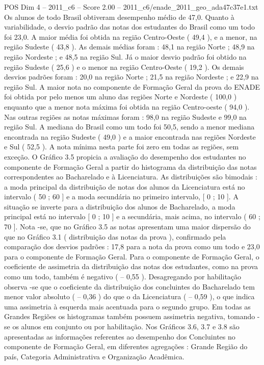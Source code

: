 \begin{textsample}{POS Dim 4 – 2011\_c6 – Score 2.00 – 2011\_c6/enade\_2011\_geo\_ada47c37e1.txt}
Os alunos de todo Brasil obtiveram desempenho médio de 47,0.
Quanto à variabilidade, o desvio padrão das notas dos estudantes do Brasil como um todo foi 23,0.
A maior média foi obtida na região Centro-Oeste ( 49,4 ), e a menor, na região Sudeste ( 43,8 ).
As demais médias foram : 48,1 na região Norte ; 48,9 na região Nordeste ; e 48,5 na região Sul.
Já o maior desvio padrão foi obtido na região Sudeste ( 25,6 ) e o menor na região Centro-Oeste ( 19,2 ).
Os demais desvios padrões foram : 20,0 na região Norte ; 21,5 na região Nordeste ; e 22,9 na região Sul.
A maior nota no componente de Formação Geral da prova do ENADE foi obtida por pelo menos um aluno das regiões Norte e Nordeste ( 100,0 ) enquanto que a menor nota máxima foi obtida na região Centro-oeste ( 94,0 ).
Nas outras regiões as notas máximas foram : 98,0 na região Sudeste e 99,0 na região Sul.
A mediana do Brasil como um todo foi 50,5, sendo a menor mediana encontrada na região Sudeste ( 49,0 ) e a maior encontrada nas regiões Nordeste e Sul ( 52,5 ).
A nota mínima nesta parte foi zero em todas as regiões, sem exceção.
O Gráfico 3.5 propicia a avaliação do desempenho dos estudantes no componente de Formação Geral a partir do histograma da distribuição das notas correspondentes ao Bacharelado e à Licenciatura.
As distribuições são bimodais : a moda principal da distribuição de notas dos alunos da Licenciatura está no intervalo ( 50 ; 60 ] e a moda secundária no primeiro intervalo, [ 0 ; 10 ].
A situação se inverte para a distribuição dos alunos de Bacharelado, a moda principal está no intervalo [ 0 ; 10 ] e a secundária, mais acima, no intervalo ( 60 ; 70 ].
Nota -se, que no Gráfico 3.5 as notas apresentam uma maior dispersão do que no Gráfico 3.1 ( distribuição das notas da prova ), confirmado pela comparação dos desvios padrões : 17,8 para a nota da prova como um todo e 23,0 para o componente de Formação Geral.
Para o componente de Formação Geral, o coeficiente de assimetria da distribuição das notas dos estudantes, como na prova como um todo, também é negativo ( – 0,55 ).
Desagregando por habilitação observa -se que o coeficiente da distribuição dos concluintes do Bacharelado tem menor valor absoluto ( – 0,36 ) do que o da Licenciatura ( – 0,59 ), o que indica uma assimetria à esquerda mais acentuada para o segundo grupo.
Em todas as Grandes Regiões os histogramas também possuem assimetria negativa, tomando -se os alunos em conjunto ou por habilitação.
Nos Gráficos 3.6, 3.7 e 3.8 são apresentadas as informações referentes ao desempenho dos Concluintes no componente de Formação Geral, em diferentes agregações : Grande Região do país, Categoria Administrativa e Organização Acadêmica.

\end{textsample}
